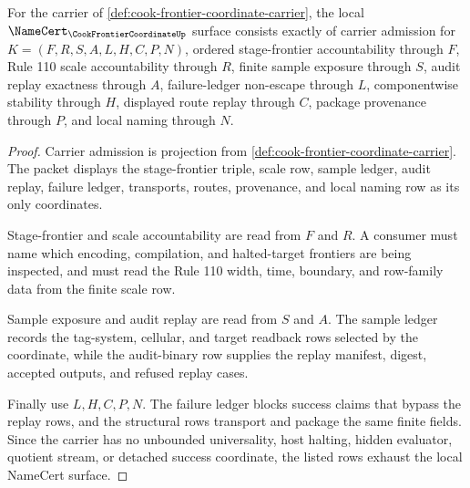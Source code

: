 \begin{theorem}
\label{thm:cook-frontier-coordinate-namecert-obligations}
For the carrier of \autoref{def:cook-frontier-coordinate-carrier}, the local $\NameCert_{\CookFrontierCoordinateUp}$ surface consists exactly of carrier admission for $K=(F,R,S,A,L,H,C,P,N)$, ordered stage-frontier accountability through $F$, Rule 110 scale accountability through $R$, finite sample exposure through $S$, audit replay exactness through $A$, failure-ledger non-escape through $L$, componentwise stability through $H$, displayed route replay through $C$, package provenance through $P$, and local naming through $N$.
\end{theorem}
\begin{proof}
Carrier admission is projection from \autoref{def:cook-frontier-coordinate-carrier}. The packet displays the stage-frontier triple, scale row, sample ledger, audit replay, failure ledger, transports, routes, provenance, and local naming row as its only coordinates.

Stage-frontier and scale accountability are read from $F$ and $R$. A consumer must name which encoding, compilation, and halted-target frontiers are being inspected, and must read the Rule 110 width, time, boundary, and row-family data from the finite scale row.

Sample exposure and audit replay are read from $S$ and $A$. The sample ledger records the tag-system, cellular, and target readback rows selected by the coordinate, while the audit-binary row supplies the replay manifest, digest, accepted outputs, and refused replay cases.

Finally use $L,H,C,P,N$. The failure ledger blocks success claims that bypass the replay rows, and the structural rows transport and package the same finite fields. Since the carrier has no unbounded universality, host halting, hidden evaluator, quotient stream, or detached success coordinate, the listed rows exhaust the local NameCert surface.
\end{proof}

